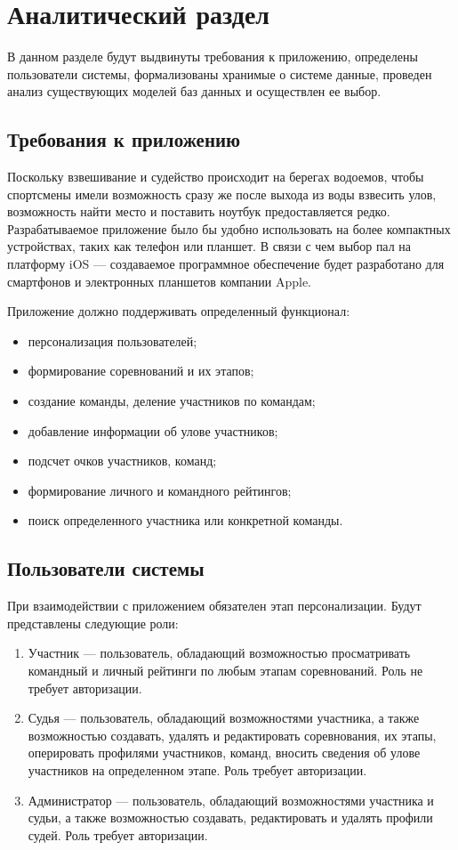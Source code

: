 \section{Аналитический раздел} \label{analysis}

В данном разделе будут выдвинуты требования к приложению, определены пользователи системы, формализованы хранимые о системе данные, проведен анализ существующих моделей баз данных и осуществлен ее выбор.

\subsection{Требования к приложению}

Поскольку взвешивание и судейство происходит на берегах водоемов, чтобы спортсмены имели возможность сразу же после выхода из воды взвесить улов, возможность найти место и поставить ноутбук предоставляется редко. Разрабатываемое приложение было бы удобно использовать на более компактных устройствах, таких как телефон или планшет. В связи с чем выбор пал на платформу iOS --- создаваемое программное обеспечение будет разработано для смартфонов и электронных планшетов компании Apple.

Приложение должно поддерживать определенный функционал:
\begin{itemize}[label=---]
	\item персонализация пользователей;
	\item формирование соревнований и их этапов;
	\item создание команды, деление участников по командам;
	\item добавление информации об улове участников;
	\item подсчет очков участников, команд;
	\item формирование личного и командного рейтингов;
	\item поиск определенного участника или конкретной команды.
\end{itemize}

\subsection{Пользователи системы}

При взаимодействии с приложением обязателен этап персонализации. Будут представлены следующие роли:
\begin{enumerate}
	\item Участник --- пользователь, обладающий возможностью просматривать командный и личный рейтинги по любым этапам соревнований. Роль не требует авторизации.
	\item Судья --- пользователь, обладающий возможностями участника, а также возможностью создавать, удалять и редактировать соревнования, их этапы, оперировать профилями участников, команд, вносить сведения об улове участников на определенном этапе. Роль требует авторизации.
	\item Администратор ---  пользователь, обладающий возможностями участника и судьи, а также возможностью создавать, редактировать и удалять профили судей. Роль требует авторизации.
\end{enumerate}

